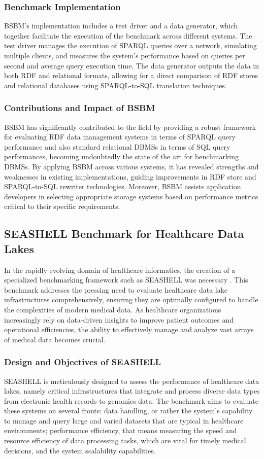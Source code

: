 \subsubsection{Benchmark Implementation}
BSBM's implementation includes a test driver and a data generator, which together facilitate the execution of the benchmark across different systems. The test driver manages the execution of \ac{SPARQL} queries over a network, simulating multiple clients, and measures the system's performance based on queries per second and average query execution time.
The data generator outputs the data in both \ac{RDF} and relational formats, allowing for a direct comparison of \ac{RDF} stores and relational databases using \ac{SPARQL}-to-SQL translation techniques.
\subsubsection{Contributions and Impact of BSBM}
\ac{BSBM} has significantly contributed to the field by providing a robust framework for evaluating \ac{RDF} data management systems in terms of \ac{SPARQL} query performance and also standard relational \ac{DBMS}s in terms of \ac{SQL} query performances, becoming undoubtedly the state of the art for benchmarking \ac{DBMS}s. By applying \ac{BSBM} across various systems, it has revealed strengths and weaknesses in existing implementations, guiding improvements in \ac{RDF} store and \ac{SPARQL}-to-SQL rewriter technologies. Moreover, \ac{BSBM} assists application developers in selecting appropriate storage systems based on performance metrics critical to their specific requirements.

\subsection{SEASHELL Benchmark for Healthcare Data Lakes} \label{chp:dolci}
In the rapidly evolving domain of healthcare informatics, the creation of a specialized benchmarking framework such as \ac{SEASHELL} was necessary \cite{dolci2024tools}. This benchmark addresses the pressing need to evaluate healthcare data lake infrastructures comprehensively, ensuring they are optimally configured to handle the complexities of modern medical data. As healthcare organizations increasingly rely on data-driven insights to improve patient outcomes and operational efficiencies, the ability to effectively manage and analyze vast arrays of medical data becomes crucial.
\subsubsection{Design and Objectives of SEASHELL}
SEASHELL is meticulously designed to assess the performance of healthcare data lakes, namely critical infrastructures that integrate and process diverse data types from electronic health records to genomics data. The benchmark aims to evaluate these systems on several fronts: data handling, or rather the system's capability to manage and query large and varied datasets that are typical in healthcare environments; performance efficiency, that means measuring the speed and resource efficiency of data processing tasks, which are vital for timely medical decisions, and the system scalability capabilities.

